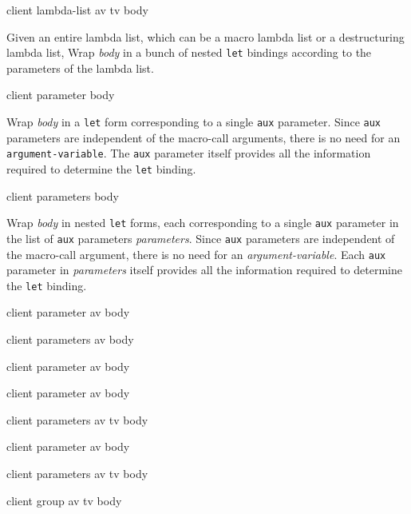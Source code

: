  {client lambda-list av tv body}

Given an entire lambda list, which can be a macro lambda list or a
destructuring lambda list, Wrap \textit{body} in a bunch of nested
\texttt{let} bindings according to the parameters of the lambda list.

 {client parameter body}

Wrap \textit{body} in a \texttt{let} form corresponding to a single
\texttt{aux} parameter.  Since \texttt{aux} parameters are independent
of the macro-call arguments, there is no need for an
\texttt{argument-variable}.  The \texttt{aux} parameter itself
provides all the information required to determine the \texttt{let}
binding.

 {client parameters body}

Wrap \textit{body} in nested \texttt{let} forms, each corresponding to
a single \texttt{aux} parameter in the list of \texttt{aux} parameters
\textit{parameters}.  Since \texttt{aux} parameters are independent of
the macro-call argument, there is no need for an
\textit{argument-variable}.  Each \texttt{aux} parameter in
\textit{parameters} itself provides all the information required to
determine the \texttt{let} binding.

 {client parameter av body}

 {client parameters av body}

 {client parameter av body}

 {client parameter av body}

 {client parameters av tv body}

 {client parameter av body}

 {client parameters av tv body}

 {client group av tv body}

